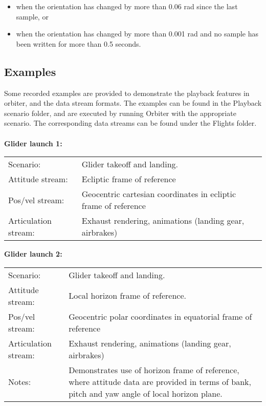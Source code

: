 \documentclass[Orbiter Technical Reference.tex]{subfiles}
\begin{document}
\begin{itemize}
\item when the orientation has changed by more than 0.06 rad since the last sample, or
\item when the orientation has changed by more than 0.001 rad and no sample has been written for more than 0.5 seconds.
\end{itemize}


\subsection{Examples}
Some recorded examples are provided to demonstrate the playback features in orbiter, and the data stream formats. The examples can be found in the Playback scenario folder, and are executed by running Orbiter with the appropriate scenario. The corresponding data streams can be found under the Flights folder.\\
\\
\textbf{Glider launch 1:}
\begin{table}[H]
	\centering
	\begin{tabularx}{\textwidth}{ l X }
	Scenario: & Glider takeoff and landing.\\
	Attitude stream: & Ecliptic frame of reference\\
	Pos/vel stream: & Geocentric cartesian coordinates in ecliptic frame of reference\\
	Articulation stream: & Exhaust rendering, animations (landing gear, airbrakes)\\
	\end{tabularx}
\end{table}

\noindent
\textbf{Glider launch 2:}
\begin{table}[H]
	\centering
	\begin{tabularx}{\textwidth}{ l X }
	Scenario: & Glider takeoff and landing.\\
	Attitude stream: & Local horizon frame of reference.\\
	Pos/vel stream: & Geocentric polar coordinates in equatorial frame of reference\\
	Articulation stream: & Exhaust rendering, animations (landing gear, airbrakes)\\
	Notes: & Demonstrates use of horizon frame of reference, where attitude data are provided in terms of bank, pitch and yaw angle of local horizon plane.\\
	\end{tabularx}
\end{table}
\end{document}
